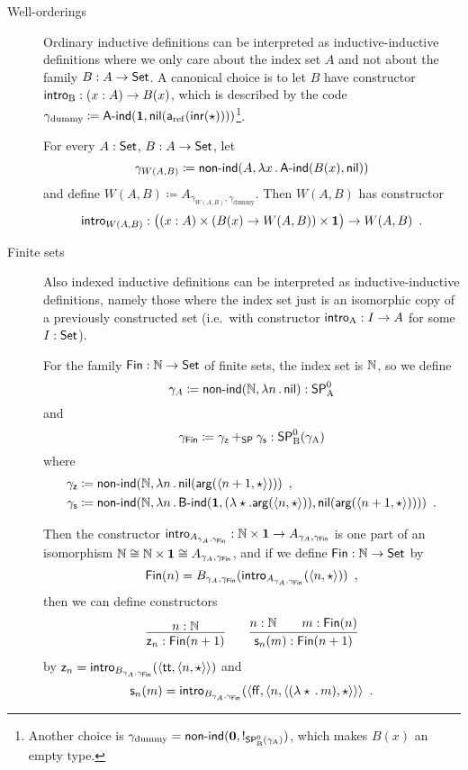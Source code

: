 \documentclass{schwicht}
\begin{document}
\begin{description}
\item[Well-orderings] Ordinary inductive definitions can be
  interpreted as inductive-inductive definitions where we only care
  about the index set $A$ and not about the family $B : A \to \mathsf{Set}$. A
  canonical choice is to let $B$ have constructor $\mathsf{intro}_{\mathrm{B}} : (x : A)
  \to B(x)$, which is described by the code $\gamma_{\text{dummy}}
  \coloneqq \mathsf{A}\text{-}\mathsf{ind}(\mathbf{1},
  \mathsf{nil}(\mathsf{a}_{\mathrm{ref}}(\mathsf{inr}(\star))))$\footnote{Another choice is
    $\gamma_{\text{dummy}} = \mathsf{non}\text{-}\mathsf{ind}(\mathbf{0}, !_{\mathsf{SP}^{0}_{\mathrm{B}}(\gamma_{\mathrm{A}})})$, which makes $B(x)$
    an empty type.}.

  For every $A : \mathsf{Set}$, $B : A \to \mathsf{Set}$, let
  \[
  \gamma_{W(A, B)} \coloneqq \mathsf{non}\text{-}\mathsf{ind}(A, \lambda x\,.\,\mathsf{A}\text{-}\mathsf{ind}(B(x),\mathsf{nil}))
  \]
  and define $W(A, B) \coloneqq A_{\gamma_{W(A, B)},
    \gamma_{\text{dummy}}}$.  Then $W(A, B)$ has constructor
  \[
  \mathsf{intro}_{W(A, B)} : \big((x : A) \times (B(x) \to W(A, B)) \times \mathbf{1}\big) \to W(A, B) \enspace .
  \]

\item[Finite sets] Also indexed inductive definitions can be
  interpreted as inductive-inductive definitions, namely those where
  the index set just is an isomorphic copy of a previously constructed
  set (i.e.\ with constructor $\mathsf{intro}_{\mathrm{A}} : I \to A$ for some $I : \mathsf{Set}$).

  For the family $\mathsf{Fin} : \mathbb{N} \to \mathsf{Set}$ of finite sets, the index set
  is $\mathbb{N}$, so we define
  \[
  \gamma_A \coloneqq \mathsf{non}\text{-}\mathsf{ind}(\mathbb{N}, \lambda n\,.\,\mathsf{nil}) : \mathsf{SP}^{0}_{\mathrm{A}}
  \]
  and
  \[
  \gamma_{\mathsf{Fin}} \coloneqq \gamma_{\mathsf{z}} +_{\mathsf{SP}} \gamma_{\mathsf{s}} : \mathsf{SP}^{0}_{\mathrm{B}}(\gamma_{\mathrm{A}})
  \]
  where
  \begin{align*}
    \gamma_{\mathsf{z}} &\coloneqq \mathsf{non}\text{-}\mathsf{ind}(\mathbb{N}, \lambda n\,.\,\mathsf{nil}(\mathsf{arg}(\langle n + 1 , \star\rangle))) \enspace ,\\
    \gamma_{\mathsf{s}} &\coloneqq \mathsf{non}\text{-}\mathsf{ind}(\mathbb{N}, \lambda n\,.\,\mathsf{B}\text{-}\mathsf{ind}(\mathbf{1}, (\lambda \star . \mathsf{arg}(\langle n , \star\rangle)), \mathsf{nil}(\mathsf{arg}(\langle n + 1 , \star\rangle)))) \enspace .
  \end{align*} 

  Then the constructor $\mathsf{intro}_{A_{\gamma_A, \gamma_{\mathsf{Fin}}}} : \mathbb{N} \times \mathbf{1} \to
  A_{\gamma_A, \gamma_{\mathsf{Fin}}}$ is one part of an isomorphism $\mathbb{N}
  \cong \mathbb{N} \times \mathbf{1} \cong A_{\gamma_A, \gamma_{\mathsf{Fin}}}$, and if we
  define $\mathsf{Fin} : \mathbb{N} \to \mathsf{Set}$ by 
  \[
  \mathsf{Fin}(n) = B_{\gamma_A, \gamma_{\mathsf{Fin}}}(\mathsf{intro}_{A_{\gamma_A,  \gamma_{\mathsf{Fin}}}}(\langle n , \star\rangle)) \enspace ,
  \] 
  then we can define constructors
  \begin{align*}
    \infer{\finzero{n} : \Fin(n + 1)}{n : \Nat} \qquad
\infer{\finsucc{n}{m} : \Fin(n + 1)}{n : \Nat & \quad m : \Fin(n)}
  \end{align*}
  by $\mathsf{z}_{n} = \mathsf{intro}_{B_{\gamma_A,
      \gamma_{\mathsf{Fin}}}}(\langle \mathsf{tt} , \langle n , \star\rangle\rangle)$ and
  \[
  \mathsf{s}_{n}(m) = \mathsf{intro}_{B_{\gamma_A,
      \gamma_{\mathsf{Fin}}}}(\langle \mathsf{ff} , \langle n , \langle (\lambda
        \star\,.\,m) , \star\rangle\rangle\rangle \enspace .
  \]


\end{description}
\end{document}

